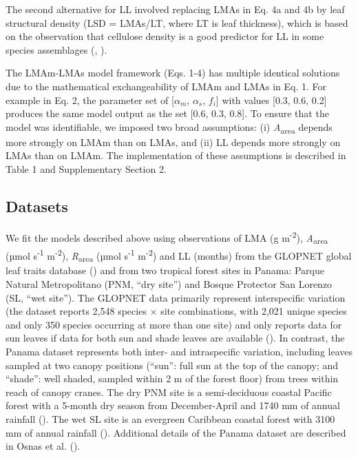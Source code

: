 \documentclass[
  12pt,
  letterpaper,
  DIV=11,
  numbers=noendperiod]{scrartcl}
\begin{document}
The second alternative for LL involved replacing LMAs in Eq. 4a and 4b
by leaf structural density (LSD = LMAs/LT, where LT is leaf thickness),
which is based on the observation that cellulose density is a good
predictor for LL in some species assemblages
(,
).

The LMAm-LMAs model framework (Eqs. 1-4) has multiple identical
solutions due to the mathematical exchangeability of LMAm and LMAs in
Eq. 1. For example in Eq. 2, the parameter set of {[}\(\alpha_m\),
\(\alpha_s\), \(f_i\){]} with values {[}0.3, 0.6, 0.2{]} produces the
same model output as the set {[}0.6, 0.3, 0.8{]}. To ensure that the
model was identifiable, we imposed two broad assumptions: (i)
\emph{A}\textsubscript{area} depends more strongly on LMAm than on LMAs,
and (ii) LL depends more strongly on LMAs than on LMAm. The
implementation of these assumptions is described in Table 1 and
Supplementary Section 2.

\subsection{Datasets}\label{datasets}

We fit the models described above using observations of LMA (g
m\textsuperscript{-2}), \emph{A}\textsubscript{area} (µmol
s\textsuperscript{-1} m\textsuperscript{-2}),
\emph{R}\textsubscript{area} (µmol s\textsuperscript{-1}
m\textsuperscript{-2}) and LL (months) from the GLOPNET global leaf
traits database () and
from two tropical forest sites in Panama: Parque Natural Metropolitano
(PNM, ``dry site'') and Bosque Protector San Lorenzo (SL, ``wet site'').
The GLOPNET data primarily represent interspecific variation (the
dataset reports 2,548 species \(\times\) site combinations, with 2,021
unique species and only 350 species occurring at more than one site) and
only reports data for sun leaves if data for both sun and shade leaves
are available (). In
contrast, the Panama dataset represents both inter- and intraspecific
variation, including leaves sampled at two canopy positions (``sun'':
full sun at the top of the canopy; and ``shade'': well shaded, sampled
within 2 m of the forest floor) from trees within reach of canopy
cranes. The dry PNM site is a semi-deciduous coastal Pacific forest with
a 5-month dry season from December-April and 1740 mm of annual rainfall
(). The wet SL site is an
evergreen Caribbean coastal forest with 3100 mm of annual rainfall
(). Additional details of
the Panama dataset are described in Osnas et al.
().
\end{document}

